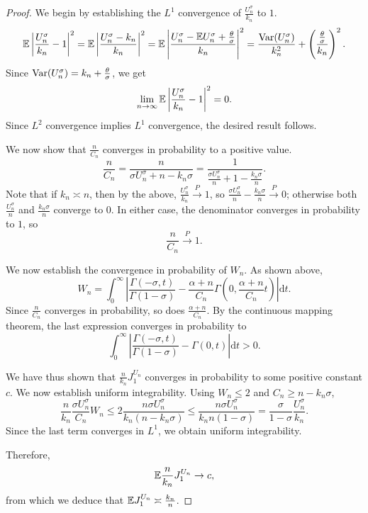 \begin{proof}
    We begin by establishing the $L^1$ convergence of $\frac{U_n^\sigma}{k_n}$ to $1$.
    \[
    \mathbb{E} \left| \frac{U_n^\sigma}{k_n} - 1\right|^2 = \mathbb{E} \left| \frac{U_n^\sigma-k_n}{k_n}\right|^2 = \mathbb{E} \left| \frac{U_n^\sigma - \mathbb{E} U_n^\sigma + \frac{\theta}{\sigma}}{k_n}\right|^2 = \frac{\mathrm{Var}(U_n^\sigma)}{k_n^2} + \left(\frac{\frac{\theta}{\sigma}}{k_n} \right)^2.
    \]
    Since $\mathrm{Var}(U_n^\sigma) = k_n + \frac{\theta}{\sigma}$, we get
    \[
    \lim_{n\to \infty}\mathbb{E} \left|\frac{U_n^\sigma}{k_n} - 1 \right|^2 = 0.
    \]
    Since $L^2$ convergence implies $L^1$ convergence, the desired result follows.

    We now show that $\frac{n}{C_n}$ converges in probability to a positive value.
    \[
    \frac{n}{C_n} = \frac{n}{\sigma U_n^\sigma + n - k_n\sigma} = \frac{1}{\frac{\sigma U_n^\sigma}{n}+ 1 - \frac{k_n\sigma}{n}}.
    \]
    Note that if $k_n \asymp n$, then by the above, $\frac{U_n^\sigma}{k_n} \overset{P}{\to} 1$, so $\frac{\sigma U_n^\sigma}{n} - \frac{k_n\sigma}{n} \overset{P}{\to} 0$; otherwise both $\frac{U_n^\sigma}{n}$ and $\frac{k_n\sigma}{n}$ converge to $0$. In either case, the denominator converges in probability to $1$, so
    \[
    \frac{n}{C_n} \overset{P}{\to} 1.
    \]

    We now establish the convergence in probability of $W_n$. As shown above,
    \[
    W_n = \int_0^\infty \left| \frac{\Gamma(-\sigma, t)}{\Gamma(1-\sigma)}- \frac{\alpha + n}{C_n}\Gamma\left( 0, \frac{\alpha + n}{C_n}t\right)\right|\mathrm{d}t.
    \]
    Since $\frac{n}{C_n}$ converges in probability, so does $\frac{\alpha+n}{C_n}$. By the continuous mapping theorem, the last expression converges in probability to
    \[
    \int_0^\infty \left| \frac{\Gamma(-\sigma, t)}{\Gamma(1-\sigma)} - \Gamma(0,t) \right|\mathrm{d}t>0.
    \]
    

    We have thus shown that $\frac{n}{k_n}J_1^{U_n}$ converges in probability to some positive constant $c$. We now establish uniform integrability. Using $W_n \leq 2$ and $C_n \geq n - k_n\sigma$,
    \[
    \frac{n}{k_n}\frac{\sigma U_n^\sigma}{C_n} W_n \leq 2\frac{n\sigma U_n^\sigma}{k_n(n-k_n\sigma)}\leq \frac{n \sigma U_n^\sigma}{k_n n(1-\sigma)} = \frac{\sigma}{1-\sigma}\frac{U_n^\sigma}{k_n}.
    \]
    Since the last term converges in $L^1$, we obtain uniform integrability.

    Therefore,
    \[
    \mathbb{E} \frac{n}{k_n}J_1^{U_n} \to c,
    \]
    from which we deduce that $\mathbb{E} J_1^{U_n} \asymp \frac{k_n}{n}$.


\end{proof}
